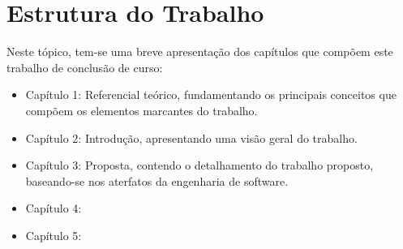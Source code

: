 \section{Estrutura do Trabalho} %


Neste tópico, tem-se uma breve apresentação dos capítulos que compõem este trabalho de conclusão de curso:

\begin{itemize}
	\item Capítulo 1: Referencial teórico, fundamentando os principais conceitos que compõem os elementos marcantes do trabalho.
	\item Capítulo 2: Introdução, apresentando uma visão geral do trabalho.
	\item Capítulo 3: Proposta, contendo o detalhamento do trabalho proposto, baseando-se nos aterfatos da engenharia de software.
	\item Capítulo 4:
	\item Capítulo 5:
\end{itemize}


